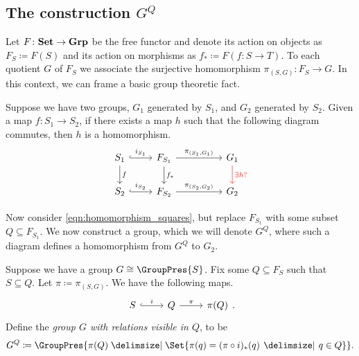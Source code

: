
\subsection{The construction \texorpdfstring{$G^Q$}{G\^Q}}

Let $F \colon \mathbf{Set} \to \mathbf{Grp}$ be the free functor and denote its action on objects as $F_S \coloneqq F(S)$ and its action on morphisms as  $f_* \coloneqq F(f \colon S \to T)$.
To each quotient $G$ of $F_S$ we associate the surjective homomorphism $\pi_{(S,G)} \colon F_S \to G$.
In this context, we can frame a basic group theoretic fact.

\begin{basic_fact}
	\label{thm:homomorphism_squares}
	Suppose we have two groups, $G_1$ generated by $S_1$, and $G_2$ generated by $S_2$.
	Given a map $f \colon S_1 \to S_2$, if there exists a map  $h$ such that the following diagram commutes, then $h$ is a homomorphism.
	\begin{equation}
		\begin{tikzcd}
			S_1 \ar[d, "f"] \ar[r, hook, "i_{S_1}"] & F_{S_1} \ar[d, "f_*"] \ar[rr, "\pi_{(S_1, G_1)}"] & & \ar[d, color=red, "\exists h?"] G_1 \\
			S_2 \ar[r, hook, "i_{S_2}"] & F_{S_2} \ar[rr, "\pi_{(S_2, G_2)}"] & & G_2
		\end{tikzcd}
		\label{eqn:homomorphism_squares}
	\end{equation}
\end{basic_fact}

Now consider \eqref{eqn:homomorphism_squares}, but replace $F_{S_1}$ with some subset $Q \subseteq F_{S_1}$.
We now construct a group, which we will denote $G^Q$, where such a diagram defines a homomorphism from $G^Q$ to $G_2$.

\begin{definition}
	Suppose we have a group $G \cong \GroupPres{S}$.
	Fix some $Q \subseteq F_S$ such that $S \subseteq Q$.
	Let $\pi \coloneq \pi_{(S,G)}$.
	We have the following maps.
	\[
		\begin{tikzcd}
			S \ar[r, hook, "i"] & Q \ar[r, "\pi"] & \pi(Q)
		\end{tikzcd}
		.\]
	Define the \emph{group $G$ with relations visible in $Q$}, to be
	\[
		G^Q \coloneqq \GroupPres{\pi(Q) \relations \Set{\pi(q) = (\pi \circ i)_*(q) \given q \in Q} }
		.\]
	\label{def:G_Q}
\end{definition}

